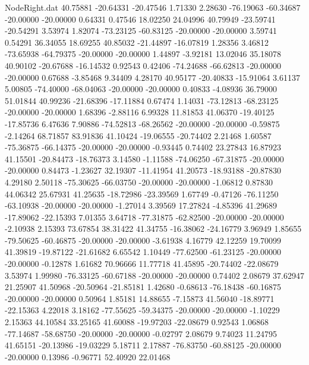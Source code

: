 \begin{filecontents}{NodeRight.dat}
  40.75881  -20.64331  -20.47546     1.71330    2.28630  -76.19063  -60.34687  -20.00000  -20.00000    0.64331    0.47546   18.02250   24.04996
  40.79949  -23.59741  -20.54291     3.53974    1.82074  -73.23125  -60.83125  -20.00000  -20.00000    3.59741    0.54291   36.34055   18.69255
  40.85032  -21.44897  -16.07819     1.28356    3.46812  -73.65938  -64.79375  -20.00000  -20.00000    1.44897   -3.92181   13.02046   35.18078
  40.90102  -20.67688  -16.14532     0.92543    0.42406  -74.24688  -66.62813  -20.00000  -20.00000    0.67688   -3.85468    9.34409    4.28170
  40.95177  -20.40833  -15.91064     3.61137    5.00805  -74.40000  -68.04063  -20.00000  -20.00000    0.40833   -4.08936   36.79000   51.01844
  40.99236  -21.68396  -17.11884     0.67474    1.14031  -73.12813  -68.23125  -20.00000  -20.00000    1.68396   -2.88116    6.99328   11.81853
  41.06370  -19.40125  -17.85736     6.47636    7.90886  -74.52813  -68.26562  -20.00000  -20.00000   -0.59875   -2.14264   68.71857   83.91836
  41.10424  -19.06555  -20.74402     2.21468    1.60587  -75.36875  -66.14375  -20.00000  -20.00000   -0.93445    0.74402   23.27843   16.87923
  41.15501  -20.84473  -18.76373     3.14580   -1.11588  -74.06250  -67.31875  -20.00000  -20.00000    0.84473   -1.23627   32.19307  -11.41954
  41.20573  -18.93188  -20.87830     4.29180    2.50118  -75.30625  -66.03750  -20.00000  -20.00000   -1.06812    0.87830   44.06342   25.67931
  41.25635  -18.72986  -23.39569     1.67749   -0.47126  -76.11250  -63.10938  -20.00000  -20.00000   -1.27014    3.39569   17.27824   -4.85396
  41.29689  -17.89062  -22.15393     7.01355    3.64718  -77.31875  -62.82500  -20.00000  -20.00000   -2.10938    2.15393   73.67854   38.31422
  41.34755  -16.38062  -24.16779     3.96949    1.85655  -79.50625  -60.46875  -20.00000  -20.00000   -3.61938    4.16779   42.12259   19.70099
  41.39819  -19.87122  -21.61682     6.65542    1.10449  -77.62500  -61.23125  -20.00000  -20.00000   -0.12878    1.61682   70.96666   11.77718
  41.45895  -20.74402  -22.08679     3.53974    1.99980  -76.33125  -60.67188  -20.00000  -20.00000    0.74402    2.08679   37.62947   21.25907
  41.50968  -20.50964  -21.85181     1.42680   -0.68613  -76.18438  -60.16875  -20.00000  -20.00000    0.50964    1.85181   14.88655   -7.15873
  41.56040  -18.89771  -22.15363     4.22018    3.18162  -77.55625  -59.34375  -20.00000  -20.00000   -1.10229    2.15363   44.10584   33.25165
  41.60088  -19.97203  -22.08679     0.92543    1.06868  -77.14687  -58.68750  -20.00000  -20.00000   -0.02797    2.08679    9.74023   11.24795
  41.65151  -20.13986  -19.03229     5.18711    2.17887  -76.83750  -60.88125  -20.00000  -20.00000    0.13986   -0.96771   52.40920   22.01468

\end{filecontents}
